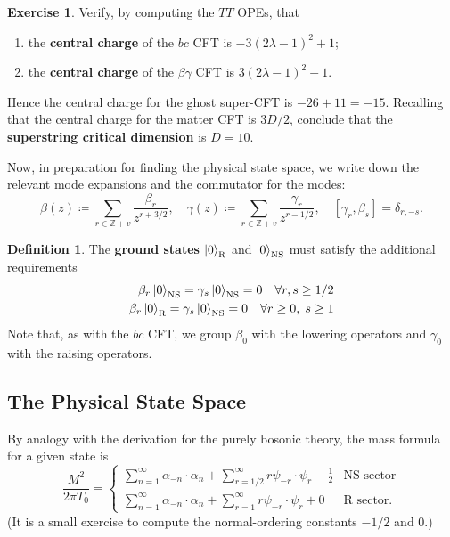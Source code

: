 \documentclass{report}
\theoremstyle{plain}
\theoremstyle{definition}
\newtheorem{definition}[theorem]{Definition}
\newtheorem{exercise}{Exercise}[section]
\theoremstyle{remark}
\newcommand{\bZ}{\mathbb{Z}}
\newcommand{\NS}{\mathrm{NS}}
\newcommand{\R}{\mathrm{R}}
\begin{document}
\begin{exercise}
  Verify, by computing the $TT$ OPEs, that
  \begin{enumerate}
  \item the {\bf central charge} of the $bc$ CFT is $-3(2\lambda -
    1)^2 + 1$;
  \item the {\bf central charge} of the $\beta\gamma$ CFT is
    $3(2\lambda - 1)^2 - 1$.
  \end{enumerate}
  Hence the central charge for the ghost super-CFT is $-26 + 11 =
  -15$. Recalling that the central charge for the matter CFT is
  $3D/2$, conclude that the {\bf superstring critical dimension} is $D
  = 10$.
\end{exercise}

Now, in preparation for finding the physical state space, we write
down the relevant mode expansions and the commutator for the modes:
\[ \beta(z) \coloneqq \sum_{r \in \bZ + v} \frac{\beta_r}{z^{r+3/2}}, \quad \gamma(z) \coloneqq \sum_{r \in \bZ + v} \frac{\gamma_r}{z^{r-1/2}}, \quad [\gamma_r, \beta_s] = \delta_{r,-s}. \]

\begin{definition}
  The {\bf ground states} $\ket{0}_{\R}$ and $\ket{0}_{\NS}$ must
  satisfy the additional requirements
  \begin{align*}
    \beta_r\ket{0}_{\NS} = \gamma_s\ket{0}_{\NS} = 0 \quad \forall r,s \ge 1/2 \\
    \beta_r\ket{0}_{\R} = \gamma_s\ket{0}_{\NS} = 0 \quad \forall r \ge 0, \; s \ge 1
  \end{align*}
  Note that, as with the $bc$ CFT, we group $\beta_0$ with the
  lowering operators and $\gamma_0$ with the raising operators.
\end{definition}

\subsection{The Physical State Space}

By analogy with the derivation for the purely bosonic theory, the mass
formula for a given state is
\[ \frac{M^2}{2\pi T_0} = \begin{cases} \sum_{n=1}^\infty \alpha_{-n} \cdot \alpha_n + \sum_{r=1/2}^\infty r \psi_{-r} \cdot \psi_r - \frac{1}{2} & \text{NS sector} \\ \sum_{n=1}^\infty \alpha_{-n} \cdot \alpha_n + \sum_{r=1}^\infty r \psi_{-r} \cdot \psi_r + 0 & \text{R sector}. \end{cases} \]
(It is a small exercise to compute the normal-ordering constants
$-1/2$ and $0$.)
\end{document}
